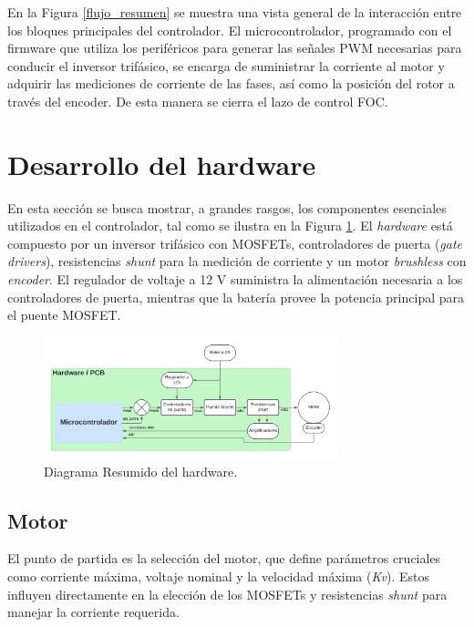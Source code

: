 \documentclass[11pt]{report}
\begin{document}
En la Figura \ref{flujo_resumen} se muestra una vista general de la interacción entre los bloques principales del controlador. El microcontrolador, programado con el firmware que utiliza los periféricos para generar las señales PWM necesarias para conducir el inversor trifásico, se encarga de suministrar la corriente al motor y adquirir las mediciones de corriente de las fases, así como la posición del rotor a través del encoder. De esta manera se cierra el lazo de control FOC.

\newpage
\section{Desarrollo del hardware}
En esta sección se busca mostrar, a grandes rasgos, los componentes esenciales utilizados en el controlador, tal como se ilustra en la Figura \ref{flujo_resumen_hardware}. El \emph{hardware} está compuesto por un inversor trifásico con MOSFETs, controladores de puerta (\emph{gate drivers}), resistencias \emph{shunt} para la medición de corriente y un motor \emph{brushless} con \emph{encoder}. El regulador de voltaje a 12 V suministra la alimentación necesaria a los controladores de puerta, mientras que la batería provee la potencia principal para el puente MOSFET.

\begin{figure}[ht]
	\centering
	\includegraphics[width=0.76\textwidth]{imagenes/Diagramas/Diagramas - resumen hardware.png}
	\caption{Diagrama Resumido del hardware.}
	\label{flujo_resumen_hardware}
\end{figure}
\FloatBarrier

\subsection{Motor}

El punto de partida es la selección del motor, que define parámetros cruciales como corriente máxima, voltaje nominal y la velocidad máxima (\emph{Kv}). Estos influyen directamente en la elección de los MOSFETs y resistencias \emph{shunt} para manejar la corriente requerida.
\end{document}
